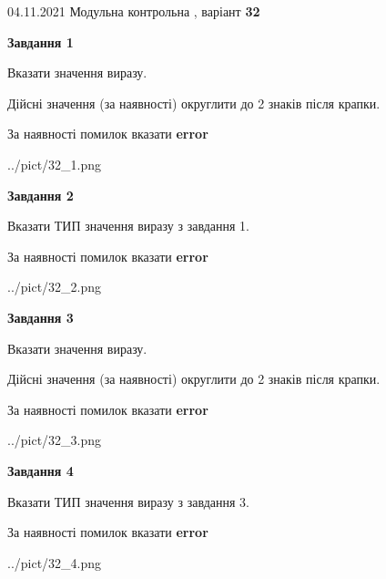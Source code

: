 \documentclass[11pt, ukrainian]{article}
\begin{document}
{04.11.2021 Модульна контрольна , варіант  \No \textbf { 32 }\par}
{
\begin {large}
{\begin {center}\textbf{Завдання 1}\end {center}}\par
Вказати значення виразу. \par
Дійсні значення (за наявності) округлити до 2 знаків після крапки. \par
За наявності помилок вказати \textbf{error}

\begin{center}
	{../pict/32_1.png}
\end{center}
\newpage

{\begin {center}\textbf{Завдання 2}\end {center}}\par
Вказати ТИП значення виразу з завдання 1. \par
За наявності помилок вказати \textbf{error}

\begin{center}
	{../pict/32_2.png}
\end{center}
\newpage

{\begin {center}\textbf{Завдання 3}\end {center}}\par
Вказати значення виразу. \par
Дійсні значення (за наявності) округлити до 2 знаків після крапки. \par
За наявності помилок вказати \textbf{error}

\begin{center}
	{../pict/32_3.png}
\end{center}
\newpage

{\begin {center}\textbf{Завдання 4}\end {center}}\par
Вказати ТИП значення виразу з завдання 3. \par
За наявності помилок вказати \textbf{error}

\begin{center}
	{../pict/32_4.png}
\end{center}
\newpage


\end{large}}
\end{document}
